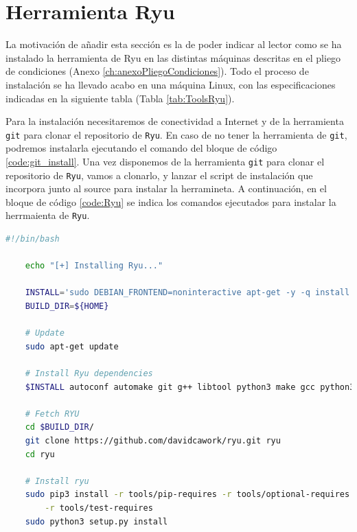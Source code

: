 \newpage
\section{Herramienta Ryu}
\label{sec:ToolsRyu}
La motivación de añadir esta sección es la de poder indicar al lector como se ha instalado la herramienta de Ryu en las distintas máquinas descritas en el pliego de condiciones (Anexo \ref{ch:anexoPliegoCondiciones}). Todo el proceso de instalación se ha llevado acabo en una máquina Linux, con las especificaciones indicadas en la siguiente tabla (Tabla \ref{tab:ToolsRyu}).

\begin{table}[ht!]
    \centering
    \caption{Especificaciones máquina de instalación de Ryu}
    \label{tab:ToolsRyu}
\end{table}

Para la instalación necesitaremos de conectividad a Internet y de la herramienta \texttt{git} para clonar el repositorio de \texttt{Ryu}. En caso de no tener la herramienta de \texttt{git}, podremos instalarla ejecutando el comando del bloque de código \ref{code:git_install}. Una vez disponemos de la herramienta \texttt{git} para clonar el repositorio de \texttt{Ryu}, vamos a clonarlo, y lanzar el script de instalación que incorpora junto al source para instalar la herramineta. A continuación, en el bloque de código \ref{code:Ryu} se indica los comandos ejecutados para instalar la herrmaienta de \texttt{Ryu}.


\begin{lstlisting}[language= bash, style=Consola2, caption={Instalación de la herramienta Ryu},label=code:Ryu]
    #!/bin/bash

    echo "[+] Installing Ryu..."
    
    INSTALL='sudo DEBIAN_FRONTEND=noninteractive apt-get -y -q install'
    BUILD_DIR=${HOME}
    
    # Update
    sudo apt-get update
    
    # Install Ryu dependencies
    $INSTALL autoconf automake git g++ libtool python3 make gcc python3-pip python3-dev libffi-dev libssl-dev libxml2-dev libxslt1-dev zlib1g-dev
    
    # Fetch RYU
    cd $BUILD_DIR/
    git clone https://github.com/davidcawork/ryu.git ryu
    cd ryu
    
    # Install ryu
    sudo pip3 install -r tools/pip-requires -r tools/optional-requires \
        -r tools/test-requires
    sudo python3 setup.py install
\end{lstlisting}
\vspace{1cm}


